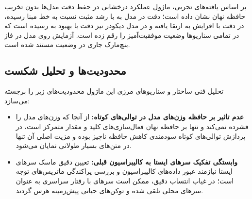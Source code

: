 بر اساس یافته‌های تجربی، ماژول  عملکرد درخشانی در حفظ دقت مدل‌ها بدون تخریب حافظه نهان نشان داده است؛ دقت در مدل  به  با رشد مثبت  نسبت به خط مبنا رسیده، در  دقت با افزایش  به  ارتقا یافته و در مدل دیکودر  نیز دقت با بهبود  به  رسیده است که در تمامی سناریوها وضعیت موفقیت‌آمیز  را رقم زده است. آزمایش روی مدل  در فاز بنچ‌مارک جاری در وضعیت  مستند شده است.

\subsection{محدودیت‌ها و تحلیل شکست}
تحلیل فنی ساختار و سناریوهای مرزی این ماژول محدودیت‌های زیر را برجسته می‌سازد:
\begin{itemize}
    \item \textbf{عدم تاثیر بر حافظه وزن‌های مدل در توالی‌های کوتاه:} از آنجا که  وزن‌های مدل را فشرده نمی‌کند و تنها بر حافظه نهان فعال‌سازی‌های کلید و مقدار متمرکز است، در پردازش توالی‌های کوتاه سودمندی کاهش حافظه ناچیز بوده و مزیت اصلی آن تنها در متن‌های بسیار طولانی نمایان می‌شود.
    \item \textbf{وابستگی تفکیک سرهای ایستا به کالیبراسیون قبلی:} تعیین دقیق ماسک سرهای ایستا نیازمند عبور داده‌های کالیبراسیون و بررسی پراکندگی ماتریس‌های توجه است؛ در غیاب انتساب دقیق، ممکن است سرهای با رفتار سراسری به عنوان سرهای محلی تلقی شده و توکن‌های حیاتی پیش‌زمینه هرس گردند.
\end{itemize}
